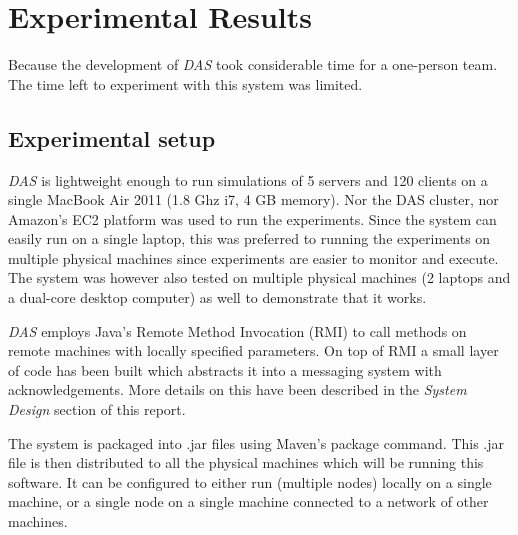 \documentclass{article}
\begin{document}
\section{Experimental Results}
\label{sec:results}

Because the development of \textit{DAS} took considerable time for a one-person team. The time left to experiment with this system was limited. 

\subsection{Experimental setup}
\textit{DAS} is lightweight enough to run simulations of 5 servers and 120 clients on a single MacBook Air 2011 (1.8 Ghz i7, 4 GB memory). Nor the DAS cluster, nor Amazon's EC2 platform was used to run the experiments. Since the system can easily run on a single laptop, this was preferred to running the experiments on multiple physical machines since experiments are easier to monitor and execute. The system was however also tested on multiple physical machines (2 laptops and a dual-core desktop computer) as well to demonstrate that it works.

\textit{DAS} employs Java's Remote Method Invocation (RMI) to call methods on remote machines with locally specified parameters. On top of RMI a small layer of code has been built which abstracts it into a messaging system with acknowledgements. More details on this have been described in the \textit{System Design} section of this report.

The system is packaged into .jar files using Maven's package command. This .jar file is then distributed to all the physical machines which will be running this software. It can be configured to either run (multiple nodes) locally on a single machine, or a single node on a single machine connected to a network of other machines.
\end{document}
